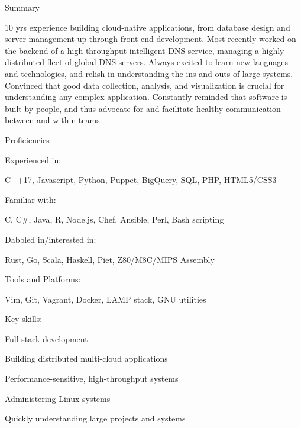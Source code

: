 \documentclass[letterpaper,12pt]{article}
\begin{document}
\begin{paracol}{2}
\begin{res_section}{Summary}
  \noindent
  \begin{minipage}{\columnwidth}
  \small
  10 yrs experience building cloud-native applications, from database design and server management up through front-end development.
  Most recently worked on the backend of a high-throughput intelligent DNS service, managing a highly-distributed fleet of
  global DNS servers. Always excited to learn new languages and technologies, and relish in understanding the ins and outs of large systems.
  Convinced that good data collection, analysis, and visualization is crucial for understanding any complex application.
  Constantly reminded that software is built by people, and thus advocate for and facilitate healthy communication between and within teams.
  \end{minipage}
\end{res_section}
\begin{res_section}{Proficiencies}
  \begin{res_para}{Experienced in:}%
    \raggedright
    C++17, Javascript, Python, Puppet, BigQuery, SQL, PHP, HTML5/CSS3
  \end{res_para}
  \begin{res_para}{Familiar with:}%
    \raggedright
    C, C\#, Java, R, Node.js, Chef, Ansible, Perl, Bash scripting
  \end{res_para}
  \begin{res_para}{Dabbled in/interested in:}%
    \raggedright
    Rust, Go, Scala, Haskell, Piet, Z80/M8C/MIPS Assembly
  \end{res_para}
  \begin{res_para}{Tools and Platforms:}%
    \raggedright
    Vim, Git, Vagrant, Docker, LAMP stack, GNU utilities\\
  \end{res_para}
  \newpage
  \begin{res_subsection}[
    leftmargin=1.5em,
    itemindent=0em,
    labelwidth=1.5em
  ]{Key skills:}
    \item Full-stack development
    \item Building distributed multi-cloud applications
    \item Performance-sensitive, high-throughput systems
    \item Administering Linux systems
    \item Quickly understanding large projects and systems

\end{res_subsection}
\end{res_section}
\end{paracol}
\end{document}

